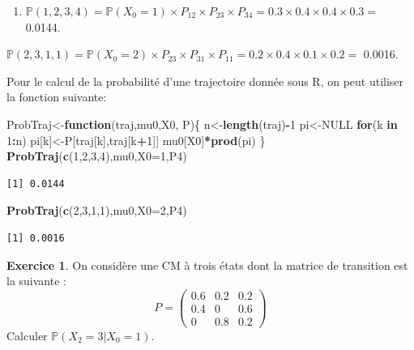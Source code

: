 \documentclass[
]{book}
\newenvironment{Shaded}{\begin{snugshade}}{\end{snugshade}}
\newcommand{\ControlFlowTok}[1]{\textcolor[rgb]{0.13,0.29,0.53}{\textbf{#1}}}
\newcommand{\DataTypeTok}[1]{\textcolor[rgb]{0.13,0.29,0.53}{#1}}
\newcommand{\DecValTok}[1]{\textcolor[rgb]{0.00,0.00,0.81}{#1}}
\newcommand{\KeywordTok}[1]{\textcolor[rgb]{0.13,0.29,0.53}{\textbf{#1}}}
\newcommand{\NormalTok}[1]{#1}
\newcommand{\OperatorTok}[1]{\textcolor[rgb]{0.81,0.36,0.00}{\textbf{#1}}}
\newcommand{\OtherTok}[1]{\textcolor[rgb]{0.56,0.35,0.01}{#1}}
\providecommand{\tightlist}{%
  \setlength{\itemsep}{0pt}\setlength{\parskip}{0pt}}
\theoremstyle{definition}
\theoremstyle{definition}
\theoremstyle{definition}
\newtheorem{exercise}{Exercice}[chapter]
\theoremstyle{remark}
\begin{document}
\begin{enumerate}
\def\labelenumi{\arabic{enumi}.}
\setcounter{enumi}{1}
\tightlist
\item
  \(\mathbb{P}(1,2,3,4)=\mathbb{P}(X_0=1)\times P_{12}\times P_{23}\times P_{34}= 0.3 \times 0.4 \times 0.4 \times 0.3 =\) 0.0144.
\end{enumerate}

\(\mathbb{P}(2,3,1,1)=\mathbb{P}(X_0=2)\times P_{23}\times P_{31}\times P_{11}= 0.2 \times 0.4 \times 0.1 \times 0.2 =\) 0.0016.

Pour le calcul de la probabilité d'une trajectoire donnée sous R, on peut utiliser la fonction suivante:

\begin{Shaded}
\begin{Highlighting}[]
\NormalTok{ProbTraj<-}\ControlFlowTok{function}\NormalTok{(traj,mu0,X0, P)\{}
\NormalTok{  n<-}\KeywordTok{length}\NormalTok{(traj)}\OperatorTok{-}\DecValTok{1}
\NormalTok{  pi<-}\OtherTok{NULL}
  \ControlFlowTok{for}\NormalTok{(k }\ControlFlowTok{in} \DecValTok{1}\OperatorTok{:}\NormalTok{n) pi[k]<-P[traj[k],traj[k}\OperatorTok{+}\DecValTok{1}\NormalTok{]]}
\NormalTok{mu0[X0]}\OperatorTok{*}\KeywordTok{prod}\NormalTok{(pi)}
\NormalTok{\}}
\KeywordTok{ProbTraj}\NormalTok{(}\KeywordTok{c}\NormalTok{(}\DecValTok{1}\NormalTok{,}\DecValTok{2}\NormalTok{,}\DecValTok{3}\NormalTok{,}\DecValTok{4}\NormalTok{),mu0,}\DataTypeTok{X0=}\DecValTok{1}\NormalTok{,P4)}
\end{Highlighting}
\end{Shaded}

\begin{verbatim}
[1] 0.0144
\end{verbatim}

\begin{Shaded}
\begin{Highlighting}[]
\KeywordTok{ProbTraj}\NormalTok{(}\KeywordTok{c}\NormalTok{(}\DecValTok{2}\NormalTok{,}\DecValTok{3}\NormalTok{,}\DecValTok{1}\NormalTok{,}\DecValTok{1}\NormalTok{),mu0,}\DataTypeTok{X0=}\DecValTok{2}\NormalTok{,P4)}
\end{Highlighting}
\end{Shaded}

\begin{verbatim}
[1] 0.0016
\end{verbatim}

\begin{exercise}
\protect\hypertarget{exr:unnamed-chunk-54}{}{\label{exr:unnamed-chunk-54} } On considère une CM à trois états dont la matrice de transition est la suivante :
\[ P=\left( 
  \begin{array}{ccc}
0.6 & 0.2 & 0.2 \\
0.4 & 0 & 0.6 \\
0 & 0.8 & 0.2
\end{array}
\right)\]
Calculer \(\mathbb{P}(X_2=3|X_0=1)\).
\end{exercise}
\end{document}
